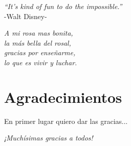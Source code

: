 {
	\vspace*{1cm}
	\begin{flushright}
		\textit{``It's kind of fun to do the impossible.''}\\
		\vspace{10pt}
		-Walt Disney-
	\end{flushright}
	
	\vspace*{14cm}
	\begin{flushright}
		\textit{A mi rosa mas bonita,\\
		la más bella del rosal,\\
		gracias por enseñarme,\\
		lo que es vivir y luchar.}
	\end{flushright}
}

\chapter*{Agradecimientos}

En primer lugar quiero dar las gracias...\\

\begin{flushright}
	\emph{¡Muchísimas gracias a todos!}
\end{flushright}